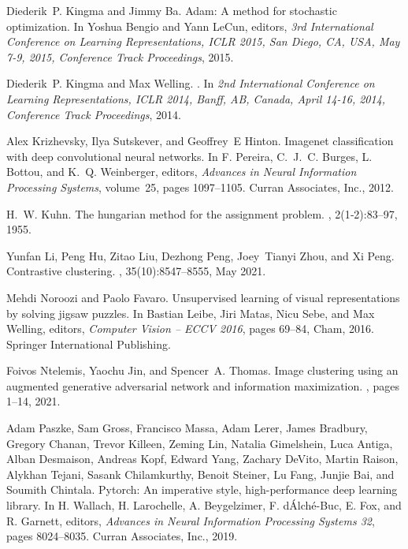 \documentclass[journal]{IEEEtran}
\begin{document}
{\begin{thebibliography}{10}
Diederik~P. Kingma and Jimmy Ba.
\newblock Adam: {A} method for stochastic optimization.
\newblock In Yoshua Bengio and Yann LeCun, editors, {\em 3rd International
  Conference on Learning Representations, {ICLR} 2015, San Diego, CA, USA, May
  7-9, 2015, Conference Track Proceedings}, 2015.

Diederik~P. Kingma and Max Welling.
.
\newblock In {\em 2nd International Conference on Learning Representations,
  {ICLR} 2014, Banff, AB, Canada, April 14-16, 2014, Conference Track
  Proceedings}, 2014.

Alex Krizhevsky, Ilya Sutskever, and Geoffrey~E Hinton.
\newblock Imagenet classification with deep convolutional neural networks.
\newblock In F. Pereira, C.~J.~C. Burges, L. Bottou, and K.~Q. Weinberger,
  editors, {\em Advances in Neural Information Processing Systems}, volume~25,
  pages 1097--1105. Curran Associates, Inc., 2012.

H.~W. Kuhn.
\newblock The hungarian method for the assignment problem.
, 2(1‐2):83--97, 1955.

Yunfan Li, Peng Hu, Zitao Liu, Dezhong Peng, Joey~Tianyi Zhou, and Xi Peng.
\newblock Contrastive clustering.
,
  35(10):8547--8555, May 2021.

Mehdi Noroozi and Paolo Favaro.
\newblock Unsupervised learning of visual representations by solving jigsaw
  puzzles.
\newblock In Bastian Leibe, Jiri Matas, Nicu Sebe, and Max Welling, editors,
  {\em Computer Vision -- ECCV 2016}, pages 69--84, Cham, 2016. Springer
  International Publishing.

Foivos Ntelemis, Yaochu Jin, and Spencer~A. Thomas.
\newblock Image clustering using an augmented generative adversarial network
  and information maximization.
,
  pages 1--14, 2021.

Adam Paszke, Sam Gross, Francisco Massa, Adam Lerer, James Bradbury, Gregory
  Chanan, Trevor Killeen, Zeming Lin, Natalia Gimelshein, Luca Antiga, Alban
  Desmaison, Andreas Kopf, Edward Yang, Zachary DeVito, Martin Raison, Alykhan
  Tejani, Sasank Chilamkurthy, Benoit Steiner, Lu Fang, Junjie Bai, and Soumith
  Chintala.
\newblock Pytorch: An imperative style, high-performance deep learning library.
\newblock In H. Wallach, H. Larochelle, A. Beygelzimer, F. d\' Alch\'{e}-Buc,
  E. Fox, and R. Garnett, editors, {\em Advances in Neural Information
  Processing Systems 32}, pages 8024--8035. Curran Associates, Inc., 2019.


\end{thebibliography}}
\end{document}
